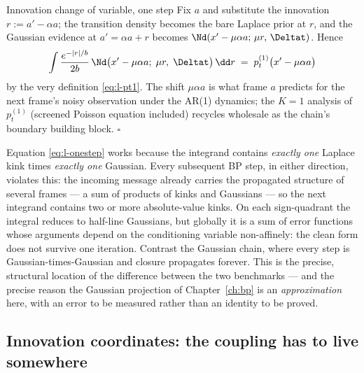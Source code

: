 \begin{toolbox}{Innovation change of variable, one step}
Fix $a$ and substitute the innovation $r := a' - \alpha a$; the transition
density becomes the bare Laplace prior at $r$, and the Gaussian evidence at
$a' = \alpha a + r$ becomes $\Nd(x' - \mu\alpha a;\, \mu r,\, \Deltat)$.
Hence
\begin{equation*}
  \int \frac{e^{-|r|/b}}{2b}\,
  \Nd\big( x' - \mu\alpha a;\; \mu r,\; \Deltat \big)\, \dd r
  \;=\; p_t^{(1)}\big( x' - \mu\alpha a \big)
\end{equation*}
by the very definition \eqref{eq:l-pt1}. The shift $\mu\alpha a$ is what
frame $a$ predicts for the next frame's noisy observation under the AR(1)
dynamics; the $K = 1$ analysis of $p_t^{(1)}$ (screened Poisson equation
included) recycles wholesale as the chain's boundary building block.
\hfill$\square$
\end{toolbox}

\begin{remark}\label{rmk:l-breakdown}
Equation \eqref{eq:l-onestep} works because the integrand contains
\emph{exactly one} Laplace kink times \emph{exactly one} Gaussian. Every
subsequent BP step, in either direction, violates this: the incoming
message already carries the propagated structure of several frames --- a
sum of products of kinks and Gaussians --- so the next integrand contains
two or more absolute-value kinks. On each sign-quadrant the integral
reduces to half-line Gaussians, but globally it is a sum of error functions
whose arguments depend on the conditioning variable non-affinely: the clean
form does not survive one iteration. Contrast the Gaussian chain, where
every step is Gaussian-times-Gaussian and closure propagates forever. This
is the precise, structural location of the difference between the two
benchmarks --- and the precise reason the Gaussian projection of
Chapter~\ref{ch:bp} is an \emph{approximation} here, with an error to be
measured rather than an identity to be proved.
\end{remark}

\subsection{Innovation coordinates: the coupling has to live somewhere}

